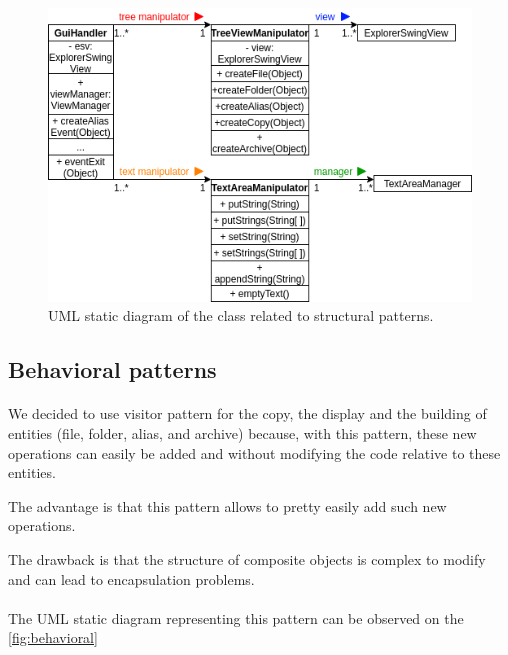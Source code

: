 \documentclass[a4paper, 11pt, oneside]{article}
\begin{document}
\begin{figure}[H]
    \centering
    \includegraphics[scale=0.6]{structural.png}
    \caption{UML static diagram of the class related to structural patterns.}\label{fig:structural}
\end{figure}

\subsection{Behavioral patterns}

\paragraph{}We decided to use visitor pattern for the copy, the display and the building of entities (file, folder, alias, and archive) because, with this pattern, these new operations can easily be added and without modifying the code relative to these entities.

The advantage is that this pattern allows to pretty easily add such new operations.

The drawback is that the structure of composite objects is complex to modify and can lead to encapsulation problems.

\paragraph{}The UML static diagram representing this pattern can be observed on the \autoref{fig:behavioral}
\end{document}
